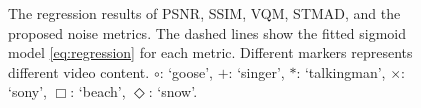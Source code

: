 \documentclass{sig-alternate}
\begin{document}
\begin{figure}
{}
\hspace*{1.7in}
\caption{\label{fig:fitting} The regression results of PSNR, SSIM, VQM, STMAD, and the proposed noise metrics. The dashed lines show the fitted sigmoid model \eqref{eq:regression} for each metric. Different markers represents different video content. $\circ$: `goose', $+$: `singer', $\ast$: `talkingman', $\times$: `sony', $\Box$: `beach', $\Diamond$: `snow'.}
\end{figure}
\end{document}
